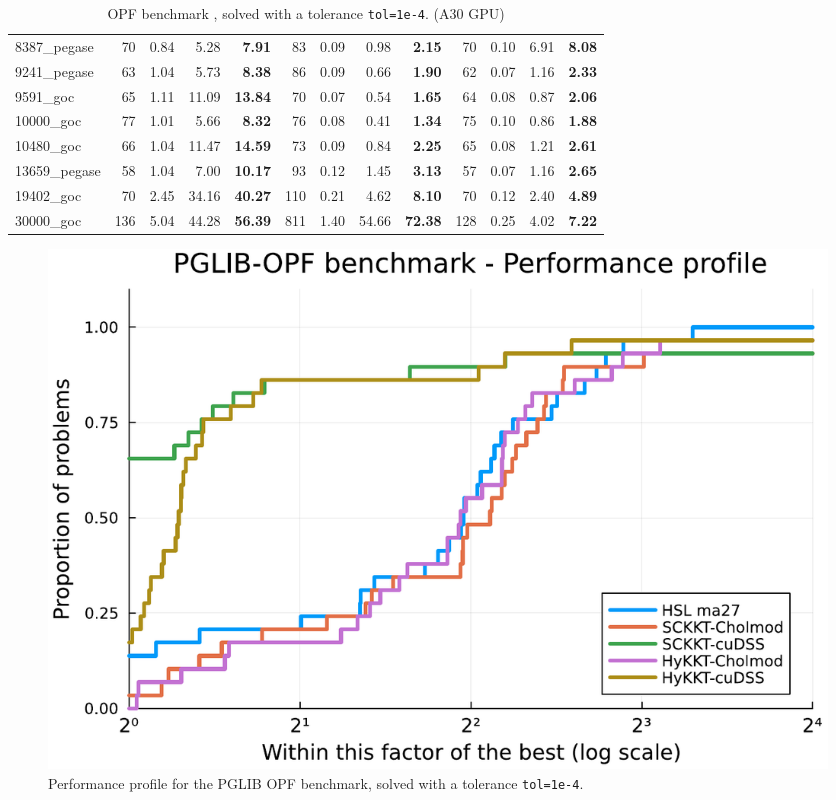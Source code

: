 \begin{table}[!ht]
{\begin{tabular}{|l|rrr >{\bfseries}r|rrr >{\bfseries}r|rrr >{\bfseries}r|}
			8387\_pegase & 70 & 0.84 & 5.28 & 7.91 & 83 & 0.09 & 0.98 & 2.15 & 70 & 0.10 & 6.91 & 8.08 \\
			9241\_pegase & 63 & 1.04 & 5.73 & 8.38 & 86 & 0.09 & 0.66 & 1.90 & 62 & 0.07 & 1.16 & 2.33 \\
			9591\_goc & 65 & 1.11 & 11.09 & 13.84 & 70 & 0.07 & 0.54 & 1.65 & 64 & 0.08 & 0.87 & 2.06 \\
			10000\_goc & 77 & 1.01 & 5.66 & 8.32 & 76 & 0.08 & 0.41 & 1.34 & 75 & 0.10 & 0.86 & 1.88 \\
			\hline
			10480\_goc & 66 & 1.04 & 11.47 & 14.59 & 73 & 0.09 & 0.84 & 2.25 & 65 & 0.08 & 1.21 & 2.61 \\
			13659\_pegase & 58 & 1.04 & 7.00 & 10.17 & 93 & 0.12 & 1.45 & 3.13 & 57 & 0.07 & 1.16 & 2.65 \\
			19402\_goc & 70 & 2.45 & 34.16 & 40.27 & 110 & 0.21 & 4.62 & 8.10 & 70 & 0.12 & 2.40 & 4.89 \\
			30000\_goc & 136 & 5.04 & 44.28 & 56.39 & 811 & 1.40 & 54.66 & 72.38 & 128 & 0.25 & 4.02 & 7.22 \\
			\hline
		\end{tabular}
  }
  \caption{OPF benchmark \label{tab:opf:benchmark}, solved with a tolerance {\tt tol=1e-4}. (A30 GPU)}
\end{table}

\begin{figure}[!ht]
  \centering
  \includegraphics[width=.6\textwidth]{../figures/pprof.pdf}
  \caption{Performance profile for the PGLIB OPF benchmark, solved
    with a tolerance {\tt tol=1e-4}.
  \label{fig:opf:pprof}}
\end{figure}



